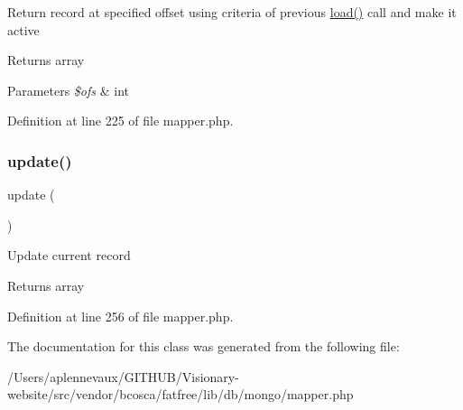 Return record at specified offset using criteria of previous \hyperlink{class_d_b_1_1_cursor_a4db66c122e6274a3d653eff639e8476f}{load()} call and make it active \begin{DoxyReturn}{Returns}
array 
\end{DoxyReturn}

\begin{DoxyParams}{Parameters}
{\em \$ofs} & int \\
\hline
\end{DoxyParams}


Definition at line 225 of file mapper.\+php.

\hypertarget{class_d_b_1_1_mongo_1_1_mapper_a842e4774e3b3601a005b995c02f7e883}{}\label{class_d_b_1_1_mongo_1_1_mapper_a842e4774e3b3601a005b995c02f7e883} 
\subsubsection{\texorpdfstring{update()}{update()}}
{\footnotesize\ttfamily update (\begin{DoxyParamCaption}{ }\end{DoxyParamCaption})}

Update current record \begin{DoxyReturn}{Returns}
array 
\end{DoxyReturn}


Definition at line 256 of file mapper.\+php.



The documentation for this class was generated from the following file\+:\begin{DoxyCompactItemize}
\item 
/\+Users/aplennevaux/\+G\+I\+T\+H\+U\+B/\+Visionary-\/website/src/vendor/bcosca/fatfree/lib/db/mongo/mapper.\+php\end{DoxyCompactItemize}
